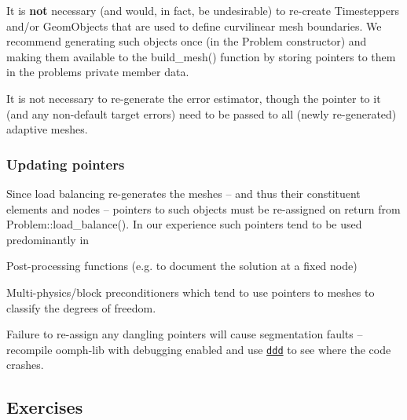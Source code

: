 It is {\bfseries not} necessary (and would, in fact, be undesirable) to re-\/create {\ttfamily Timesteppers} and/or {\ttfamily Geom\+Objects} that are used to define curvilinear mesh boundaries. We recommend generating such objects once (in the Problem constructor) and making them available to the {\ttfamily build\+\_\+mesh()} function by storing pointers to them in the problem\textquotesingle{}s private member data.

It is not necessary to re-\/generate the error estimator, though the pointer to it (and any non-\/default target errors) need to be passed to all (newly re-\/generated) adaptive meshes.\hypertarget{index_pointers}{}\subsubsection{Updating pointers}\label{index_pointers}
Since load balancing re-\/generates the meshes -- and thus their constituent elements and nodes -- pointers to such objects must be re-\/assigned on return from {\ttfamily Problem\+::load\+\_\+balance()}. In our experience such pointers tend to be used predominantly in
\begin{DoxyItemize}
\item Post-\/processing functions (e.\+g. to document the solution at a fixed node) ~\newline
~\newline

\item Multi-\/physics/block preconditioners which tend to use pointers to meshes to classify the degrees of freedom. ~\newline
~\newline

\end{DoxyItemize}Failure to re-\/assign any dangling pointers will cause segmentation faults -- recompile {\ttfamily oomph-\/lib} with debugging enabled and use \href{http://www.gnu.org/software/ddd}{\tt ddd} to see where the code crashes.\hypertarget{index_ex}{}\subsection{Exercises}\label{index_ex}

